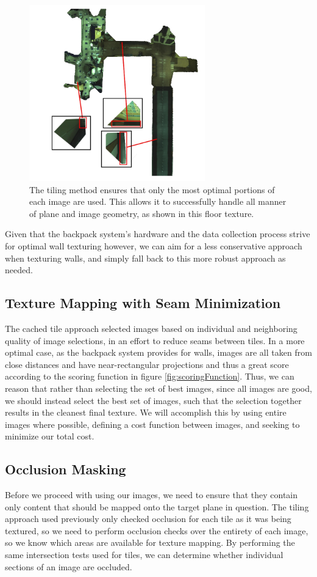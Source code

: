 \documentclass[10pt,twocolumn,letterpaper]{article}
\begin{document}
\begin{figure}
  \centering
  \includegraphics[width=3in]{floor_suboptimal.jpg}
  \caption{The tiling method ensures that only the most optimal
    portions of each image are used. This allows it to successfully
    handle all manner of plane and image geometry, as shown in this
    floor texture.}
  \label{fig:floor_suboptimal}
\end{figure}

Given that the backpack system's hardware and the data collection
process strive for optimal wall texturing however, we can aim for a
less conservative approach when texturing walls, and simply fall back
to this more robust approach as needed.

\subsection{Texture Mapping with Seam Minimization}
The cached tile approach selected images based on individual and
neighboring quality of image selections, in an effort to reduce seams
between tiles. In a more optimal case, as the backpack system provides
for walls, images are all taken from close distances and have
near-rectangular projections and thus a great score according to the
scoring function in figure \ref{fig:scoringFunction}. Thus, we can
reason that rather than selecting the set of best images, since all
images are good, we should instead select the best set of images, such
that the selection together results in the cleanest final texture. We
will accomplish this by using entire images where possible, defining a
cost function between images, and seeking to minimize our total cost.

\subsection{Occlusion Masking}
Before we proceed with using our images, we need to ensure that they
contain only content that should be mapped onto the target plane in
question. The tiling approach used previously only checked occlusion
for each tile as it was being textured, so we need to perform
occlusion checks over the entirety of each image, so we know which
areas are available for texture mapping. By performing the same
intersection tests used for tiles, we can determine whether individual
sections of an image are occluded.
\end{document}
